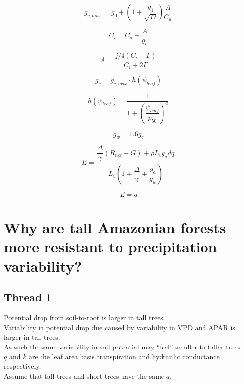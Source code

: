 \documentclass[11pt]{article}
\begin{document}
\begin{equation}
g_{c,max} = g_0 + \left(1+\dfrac{g_1}{\sqrt{D}}\right)\dfrac{A}{C_a}
\end{equation}

\begin{equation}
C_i = C_a - \dfrac{A}{g_c}
\end{equation}

\begin{equation}
A = \dfrac{j/4\left(C_i-\Gamma\right)}{C_i+2\Gamma}
\end{equation}

\begin{equation}
g_c = g_{c,max}\cdot h\left(\psi_{leaf}\right)
\end{equation}

\begin{equation}
h\left(\psi_{leaf}\right) = 
\dfrac{1}{
1+\left(\dfrac{\psi_{leaf}}{p_{50}}\right)^a
}
\end{equation}


\begin{equation}
g_w = 1.6g_c
\end{equation}

\begin{equation}
E = \dfrac{\dfrac{\Delta}{\gamma}\left(R_{net}-G\right)+\rho L_v g_a dq}
{L_v\left(1+\dfrac{\Delta}{\gamma}+\dfrac{g_a}{g_w}\right)}
\end{equation}

\begin{equation}
E = q
\end{equation}


\newpage
\section{Why are tall Amazonian forests more resistant to precipitation variability?}

\subsection{Thread 1}
Potential drop from soil-to-root is larger in tall trees. \\
Variability in potential drop due caused by variability in VPD and APAR is larger in tall trees. \\
As such the same variability in soil potential may ``feel'' smaller to taller trees \\

$q$ and $k$ are the leaf area basis transpiration and hydraulic conductance respectively. \\
Assume that tall trees and short trees have the same $q$.
\end{document}
